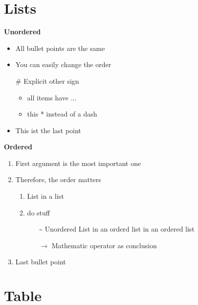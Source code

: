 \chapter{Lists}
\label{cha:lists}


\textbf{Unordered}
\begin{itemize}
    \item All bullet points are the same
    \item You can easily change the order
    \item[\#] Explicit other sign
    \begin{itemize}[*]
        \item all items have ...
        \item this * instead of a dash 
    \end{itemize}
    \item This ist the last point
\end{itemize}

\textbf{Ordered}
\begin{enumerate}
    \item First argument is the most important one
    \item Therefore, the order matters
    \begin{enumerate}
        \item List in a list
        \item do stuff
        \begin{itemize}
            \item[\textasciitilde] Unordered List in an orderd list in an ordered list
            \item[$\to$] Mathematic operator as conclusion
        \end{itemize}
    \end{enumerate}
    \item Last bullet point
\end{enumerate}

\chapter{Table}
\label{cha:table}


